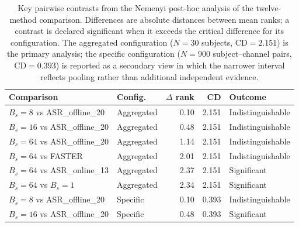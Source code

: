 \documentclass[MScCS,12pt,oneside,final]{uccthesis}
\begin{document}
\begin{table}[!htb]
    \centering
    \begin{tabular}{l l r r l}
        \toprule
        \textbf{Comparison} & \textbf{Config.} & \textbf{$\Delta$ rank} & \textbf{CD} &
        \textbf{Outcome} \\
        \midrule
        $B_s = 8$ vs ASR\_offline\_20  & Aggregated & 0.10 & 2.151 & Indistinguishable \\
        $B_s = 16$ vs ASR\_offline\_20 & Aggregated & 0.48 & 2.151 & Indistinguishable \\
        $B_s = 64$ vs ASR\_offline\_20 & Aggregated & 1.14 & 2.151 & Indistinguishable \\
        $B_s = 64$ vs FASTER           & Aggregated & 2.01 & 2.151 & Indistinguishable \\
        $B_s = 64$ vs ASR\_online\_13  & Aggregated & 2.37 & 2.151 & Significant \\
        $B_s = 64$ vs $B_s = 1$        & Aggregated & 2.34 & 2.151 & Significant \\
        \midrule
        $B_s = 8$ vs ASR\_offline\_20  & Specific   & 0.10 & 0.393 & Indistinguishable \\
        $B_s = 16$ vs ASR\_offline\_20 & Specific   & 0.48 & 0.393 & Significant \\
        \bottomrule
    \end{tabular}
    \caption{Key pairwise contrasts from the Nemenyi post-hoc analysis of the twelve-method
    comparison. Differences are absolute distances between mean ranks; a contrast is declared
    significant when it exceeds the critical difference for its configuration. The aggregated
    configuration ($N = 30$ subjects, $\mathrm{CD} = 2.151$) is the primary analysis; the specific
    configuration ($N = 900$ subject--channel pairs, $\mathrm{CD} = 0.393$) is reported as a
    secondary view in which the narrower interval reflects pooling rather than additional
    independent evidence.}
    \label{tab:pairwise_key}
\end{table}
\end{document}
